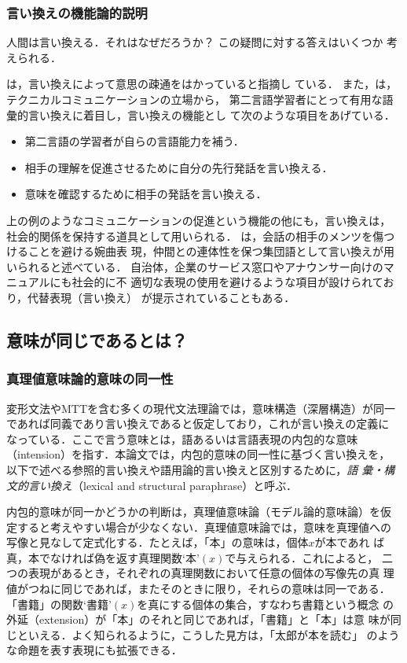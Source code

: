 \subsubsection{言い換えの機能論的説明}

人間は言い換える．それはなぜだろうか？ この疑問に対する答えはいくつか
考えられる．

は，言い換えによって意思の疎通をはかっていると指摘し
ている．
また，は，テクニカルコミュニケーションの立場から，
第二言語学習者にとって有用な語彙的言い換えに着目し，言い換えの機能とし
て次のような項目をあげている．
\begin{itemize}
\item 第二言語の学習者が自らの言語能力を補う．
\item 相手の理解を促進させるために自分の先行発話を言い換える．
\item 意味を確認するために相手の発話を言い換える．
\end{itemize}

上の例のようなコミュニケーションの促進という機能の他にも，言い換えは，
社会的関係を保持する道具として用いられる．
は，会話の相手のメンツを傷つけることを避ける婉曲表
現，仲間との連体性を保つ集団語として言い換えが用いられると述べている．
自治体，企業のサービス窓口やアナウンサー向けのマニュアルにも社会的に不
適切な表現の使用を避けるような項目が設けられており，代替表現（言い換え）
が提示されていることもある．

\subsection{意味が同じであるとは？}
\label{ssec:equivalence}

\subsubsection{真理値意味論的意味の同一性}

変形文法やMTTを含む多くの現代文法理論では，意味構造（深層構造）が同一
であれば同義であり言い換えであると仮定しており，これが言い換えの定義に
なっている．ここで言う意味とは，語あるいは言語表現の内包的な意味
（intension）を指す．本論文では，内包的意味の同一性に基づく言い換えを，
以下で述べる参照的言い換えや語用論的言い換えと区別するために，\emph{語
彙・構文的言い換え}（lexical and structural paraphrase）と呼ぶ．

内包的意味が同一かどうかの判断は，真理値意味論（モデル論的意味論）を仮
定すると考えやすい場合が少なくない．真理値意味論では，意味を真理値への
写像と見なして定式化する．たとえば，「本」の意味は，個体$x$が本であれ
ば真，本でなければ偽を返す真理関数`本'$(x)$で与えられる．これによると，
二つの表現があるとき，それぞれの真理関数において任意の個体の写像先の真
理値がつねに同じであれば，またそのときに限り，それらの意味は同一である．
「書籍」の関数`書籍'$(x)$を真にする個体の集合，すなわち書籍という概念
の外延（extension）が「本」のそれと同じであれば，「書籍」と「本」は意
味が同じといえる．よく知られるように，こうした見方は，「太郎が本を読む」
のような命題を表す表現にも拡張できる．

